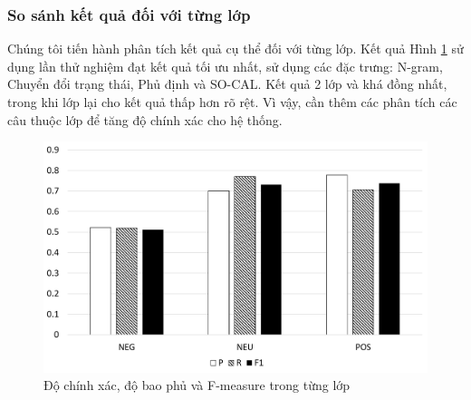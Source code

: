 \subsubsection*{So sánh kết quả đối với từng lớp}
Chúng tôi tiến hành phân tích kết quả cụ thể đối với từng lớp. Kết quả Hình \ref{fig:p-r-f-class} sử dụng lần thử nghiệm đạt kết quả tối ưu nhất, sử dụng các đặc trưng: N-gram, Chuyển đổi trạng thái, Phủ định và SO-CAL. Kết quả 2 lớp \tichcuc và \trungtinh khá đồng nhất, trong khi lớp \tieucuc lại cho kết quả thấp hơn rõ rệt. Vì vậy, cần thêm các phân tích các câu thuộc lớp \tieucuc để tăng độ chính xác cho hệ thống.
\begin{figure}
\centering
\includegraphics[scale=0.25]{./hinh/class.png}
\caption{Độ chính xác, độ bao phủ và F-measure trong từng lớp} \label{fig:p-r-f-class}
\end{figure}